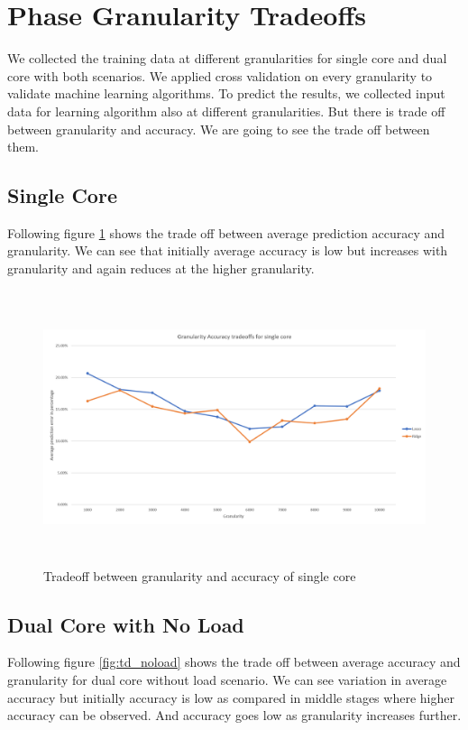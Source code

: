 \section{Phase Granularity Tradeoffs}
We collected the training data at different granularities for single core and dual core with both scenarios. We applied cross validation on every granularity to validate machine learning algorithms.  To predict the results, we collected input data for learning algorithm also at different granularities.  But there is trade off between granularity and accuracy. We are going to see the trade off between them. 

\subsection{Single Core}
Following figure \ref{fig:td_single} shows the trade off between average prediction accuracy and granularity. We can see that initially average accuracy is low but increases with granularity and again reduces at the higher granularity. 

\begin{figure}[h!]
\includegraphics[width=12cm, height=8cm]{./images/td_single}
\centering
\caption{Tradeoff between granularity and accuracy of single core}
\label{fig:td_single}
\end{figure}

\subsection{Dual Core with No Load}
Following figure \ref{fig:td_noload} shows the trade off between average accuracy and granularity for dual core without load scenario. We can see variation in average accuracy but initially accuracy is low as compared in middle stages where higher accuracy can be observed. And accuracy goes low as granularity increases further. 


